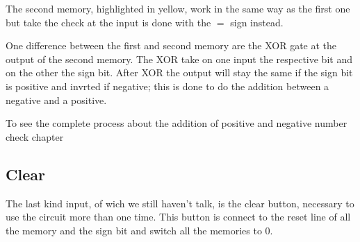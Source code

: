 \documentclass{article}
\begin{document}
\vspace{3mm}

The second memory, highlighted in yellow, work in the same way as the first one but take the check at the input is done with the $=$ sign instead.

One difference between the first and second memory are the XOR gate at the output of the second memory. The XOR take on one input the respective bit and on the other the sign bit. After XOR the output will stay the same if the sign bit is positive and invrted if negative; this is done to do the addition between a negative and a positive. 

\vspace{3mm}

To see the complete process about the addition of positive and negative number check chapter %

\subsection{Clear}

The last kind input, of wich we still haven't talk, is the clear button, necessary to use the circuit more than one time. 
This button is connect to the reset line of all the memory and the sign bit and switch all the memories to 0. 
\end{document}
